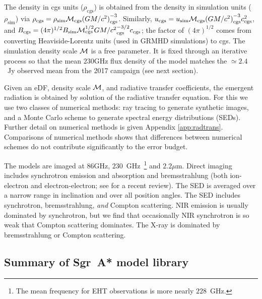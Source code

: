 The density in cgs units ($\rho_\mathrm{cgs}$) is obtained from the density  in simulation units ($\rho_\mathrm{sim}$) via $\rho_\mathrm{cgs} = \rho_\mathrm{sim} \mathcal{M}_\mathrm{cgs} {(GM/c^2)}_\mathrm{cgs}^{-3}$.  Similarly, $u_\mathrm{cgs} = u_\mathrm{sim} \mathcal{M}_\mathrm{cgs} {(GM/c^2)}_\mathrm{cgs}^{-3} c_\mathrm{cgs}^2$, and $B_\mathrm{cgs} = (4\pi)^{1/2} B_\mathrm{sim} \mathcal{M}_\mathrm{cgs}^{1/2} {GM/c^2}_\mathrm{cgs}^{-3/2} c_\mathrm{cgs}$; the factor of $(4\pi)^{1/2}$ comes from converting Heaviside-Lorentz units (used in GRMHD simulations) to cgs.
The simulation density scale $\mathcal{M}$ is a free parameter.  It is fixed through an iterative process so that the mean $230$GHz flux density of the model matches the $\simeq 2.4$~Jy observed mean from the 2017 campaign (see next section).


Given an eDF, density scale $\mathcal{M}$, and radiative transfer coefficients, the emergent radiation is obtained by solution of the radiative transfer equation.  For this we use two classes of numerical methods: ray tracing to generate synthetic images, and a Monte Carlo scheme to generate spectral energy distributions (SEDs).  Further detail on numerical methods is given Appendix \ref{app:radtrans}.  Comparisons of numerical methods \citep[][Prather et al. 2021]{2020ApJ...897..148G} shows that differences between numerical schemes do not contribute significantly to the error budget.  

The models are imaged at $86$GHz, $230$~GHz~\footnote{The mean frequency for  EHT observations is more nearly $228$~GHz.} and $2.2\mu$m.  Direct imaging includes synchrotron emission and absorption and bremsstrahlung (both ion-electron and electron-electron; see \citet{2020ApJ...898...50Y} for a recent review).  The SED is averaged over a narrow range in inclination and over all position angles. The SED includes synchrotron, bremsstrahlung, {\em and} Compton scattering.  NIR emission is usually dominated by synchrotron, but we find that occasionally NIR synchrotron is so weak that Compton scattering dominates.  The X-ray is dominated by bremsstrahlung or Compton scattering. 

\subsection{Summary of Sgr~A* model library}

